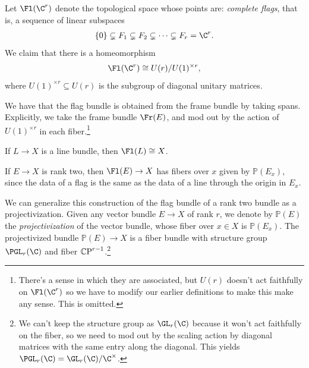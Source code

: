 \documentclass[11pt]{book}
\begin{document}
\begin{definition}\label{def:complete-flag-manifold} Let $\Fl(\C^r)$ denote the topological space whose points are: \emph{complete flags}, that is, a sequence of linear subspaces
\begin{align*}
    \{0\} \subsetneq F_1 \subsetneq F_2 \subsetneq \cdots \subsetneq F_r = \C^r.
\end{align*}
We claim that there is a homeomorphism
\begin{align*}
    \Fl(\C^r)\cong U(r)/U(1)^{\times r},
\end{align*}
where $U(1)^{\times r} \subseteq U(r)$ is the subgroup of diagonal unitary matrices.
\end{definition}

\begin{remark} We have that the flag bundle is obtained from the frame bundle by taking spans. Explicitly, we take the frame bundle $\Fr(E)$, and mod out by the action of $U(1)^{\times r}$ in each fiber.\footnote{There's a sense in which they are associated, but $U(r)$ doesn't act faithfully on $\Fl(\C^r)$ so we have to modify our earlier definitions to make this make any sense. This is omitted.}
\end{remark}

\begin{example} If $L \to X$ is a line bundle, then $\Fl(L) \cong X$.
\end{example}

\begin{example} If $E \to X$ is rank two, then $\Fl(E) \to X$ has fibers over $x$ given by $\mathbb{P}(E_x)$, since the data of a flag is the same as the data of a line through the origin in $E_x$.
\end{example}

\begin{definition}\label{def:projectivization-vector-bundle}
We can generalize this construction of the flag bundle of a rank two bundle as a projectivization. Given any vector bundle $E \to X$ of rank $r$, we denote by $\mathbb{P}(E)$ the \emph{projectivization} of the vector bundle, whose fiber over $x\in X$ is $\mathbb{P}(E_x)$. The projectivized bundle $\mathbb{P}(E) \to X$ is a fiber bundle with structure group $\PGL_r(\C)$ and fiber ${\mathbb{C}\text{P}}^{r-1}$.\footnote{We can't keep the structure group as $\GL_r(\C)$ because it won't act faithfully on the fiber, so we need to mod out by the scaling action by diagonal matrices with the same entry along the diagonal. This yields $\PGL_r(\C) = \GL_r(\C)/\C^\times$.}
\end{definition}
\end{document}
